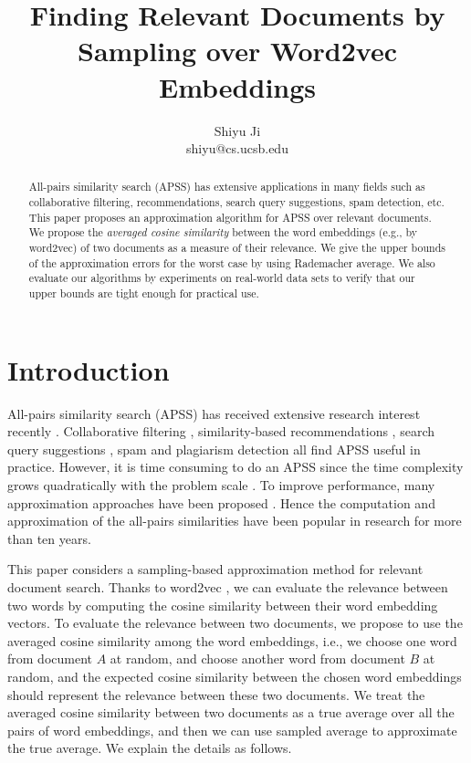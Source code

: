 \documentclass{article}
\begin{document}
\title{\Large\bf Finding Relevant Documents by Sampling over Word2vec Embeddings}
\author{Shiyu Ji\\ shiyu@cs.ucsb.edu}
\date{}
\maketitle

\newtheorem{definition}{Definition}
\theoremstyle{definition}
\newtheorem{theorem}{Theorem}
\theoremstyle{plain}
\newtheorem{lemma}{Lemma}
\theoremstyle{plain}
\newtheorem{corollary}{Corollary}
\theoremstyle{plain}

\begin{abstract}
All-pairs similarity search (APSS) has extensive applications in many fields such as collaborative filtering, recommendations, search query suggestions, spam detection, etc.
This paper proposes an approximation algorithm for APSS over relevant documents. We propose the \emph{averaged cosine similarity} between the word embeddings (e.g., by word2vec) of two documents as a measure of their relevance.
We give the upper bounds of the approximation errors for the worst case by using Rademacher average.
We also evaluate our algorithms by experiments on real-world data sets to verify that our upper bounds are tight enough for practical use.
\end{abstract}

\section{Introduction}
All-pairs similarity search (APSS) has received extensive research interest recently \cite{BMS07,Xia16,ATY13,TAJY14}. Collaborative filtering \cite{SKK01}, similarity-based recommendations \cite{RV97}, search query suggestions \cite{CJP08}, spam and plagiarism detection \cite{CDG07,LCH06} all find APSS useful in practice. However, it is time consuming to do an APSS since the time complexity grows quadratically with the problem scale \cite{BMS07,ATY13,TAJY14}. To improve performance, many approximation approaches have been proposed \cite{GIM99,FKS03,IM98,Char02,LRU14}. Hence the computation \cite{BMS07,DHM04,Xia16,ATY13,TAJY14} and approximation \cite{LRU14,GIM99,FKS03,IM98,Char02} of the all-pairs similarities have been popular in research for more than ten years.

This paper considers a sampling-based approximation method for relevant document search. Thanks to word2vec \cite{MSC13,MCC13}, we can evaluate the relevance between two words by computing the cosine similarity between their word embedding vectors. To evaluate the relevance between two documents, we propose to use the averaged cosine similarity among the word embeddings, i.e., we choose one word from document $A$ at random, and choose another word from document $B$ at random, and the expected cosine similarity between the chosen word embeddings should represent the relevance between these two documents. We treat the averaged cosine similarity between two documents as a true average over all the pairs of word embeddings, and then we can use sampled average to approximate the true average. We explain the details as follows.
\end{document}
